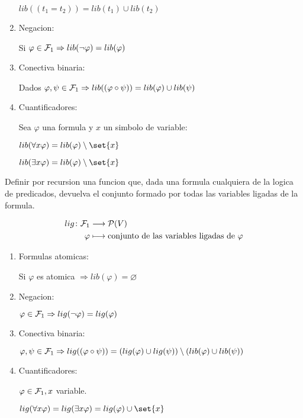 \begin{example}
\begin{enumerate}[resume]
		      \(lib((t_1=t_2)) = lib(t_1) \cup lib(t_2)\)

		\item Negacion:

		      Si \(\varphi \in  \mathcal{\MakeUppercase{f}}_1 \Rightarrow lib(\neg\varphi) = lib(\varphi)\)

		\item Conectiva binaria:

		      Dados \(\varphi, \psi \in \mathcal{\MakeUppercase{f}}_1 \Rightarrow lib((\varphi \circ \psi)) = lib(\varphi) \cup lib(\psi)\)
		\item Cuantificadores:

		      Sea \(\varphi\) una formula y \(x \) un simbolo de variable:

		      \(lib(\forall x \varphi) = lib(\varphi) \setminus \set{x}\)

		      \(lib(\exists x \varphi) = lib(\varphi) \setminus \set{x}\)
	\end{enumerate}

\end{example}

\begin{example}
	Definir por recursion una funcion que, dada una formula cualquiera de la logica de predicados, devuelva el conjunto formado por todas las variables ligadas de la formula.

	\[
		\begin{aligned}
			lig \colon \mathcal{\MakeUppercase{f}}_1 & \longrightarrow \mathcal{\MakeUppercase{p}}(V )                  \\
			\varphi                                  & \longmapsto \text{conjunto de las variables ligadas de } \varphi
		\end{aligned}
	\]
	\begin{enumerate}
		\item Formulas atomicas:

		      Si \(\varphi\) es atomica \(\Rightarrow lib(\varphi) = \varnothing\)
		\item Negacion:

		      \(\varphi \in \mathcal{\MakeUppercase{f}}_1 \Rightarrow lig(\neg \varphi) = lig(\varphi)\)

		\item Conectiva binaria:

		      \(\varphi, \psi \in \mathcal{\MakeUppercase{f}}_1 \Rightarrow lig((\varphi \circ \psi)) = (lig(\varphi) \cup lig(\psi)) \setminus (lib(\varphi) \cup lib(\psi))\)

		\item Cuantificadores:

		      \(\varphi \in  \mathcal{\MakeUppercase{f}}_1, x \) variable.

		      \(lig(\forall x \varphi) = lig(\exists x \varphi) = lig(\varphi) \cup \set{x}\)
	\end{enumerate}
\end{example}

